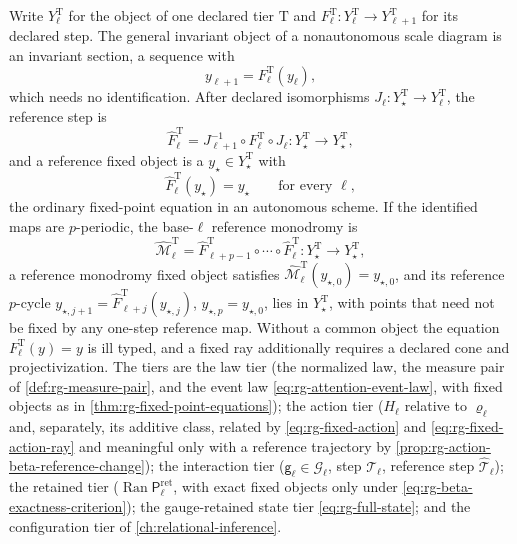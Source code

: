 Write \(Y^{\mathrm T}_\ell\) for the object of one declared tier \(\mathrm T\)
and \(F^{\mathrm T}_\ell:Y^{\mathrm T}_\ell\to Y^{\mathrm T}_{\ell+1}\) for its
declared step. The general invariant object of a nonautonomous scale diagram
is an invariant section, a sequence with
\begin{equation}
y_{\ell+1}=F^{\mathrm T}_\ell(y_\ell),
\label{eq:rg-invariant-section}
\end{equation}
which needs no identification. After declared isomorphisms
\(J_\ell:Y^{\mathrm T}_\star\to Y^{\mathrm T}_\ell\), the reference step is
\begin{equation}
\widehat F^{\mathrm T}_\ell
=J_{\ell+1}^{-1}\circ F^{\mathrm T}_\ell\circ J_\ell
:Y^{\mathrm T}_\star\longrightarrow Y^{\mathrm T}_\star,
\label{eq:rg-reference-step}
\end{equation}
and a reference fixed object is a \(y_\star\in Y^{\mathrm T}_\star\) with
\begin{equation}
\widehat F^{\mathrm T}_\ell(y_\star)=y_\star
\qquad\text{for every }\ell,
\label{eq:rg-reference-fixed-object}
\end{equation}
the ordinary fixed-point equation in an autonomous scheme. If the identified
maps are \(p\)-periodic, the base-\(\ell\) reference monodromy is
\begin{equation}
\widehat{\mathcal M}^{\mathrm T}_\ell
=\widehat F^{\mathrm T}_{\ell+p-1}\circ\cdots\circ\widehat F^{\mathrm T}_\ell
:Y^{\mathrm T}_\star\longrightarrow Y^{\mathrm T}_\star,
\label{eq:rg-monodromy-map}
\end{equation}
a reference monodromy fixed object satisfies
\(\widehat{\mathcal M}^{\mathrm T}_\ell(y_{\star,0})=y_{\star,0}\), and its
reference \(p\)-cycle
\(y_{\star,j+1}=\widehat F^{\mathrm T}_{\ell+j}(y_{\star,j})\),
\(y_{\star,p}=y_{\star,0}\), lies in \(Y^{\mathrm T}_\star\), with points that
need not be fixed by any one-step reference map. Without a common object the
equation \(F^{\mathrm T}_\ell(y)=y\) is ill typed, and a fixed ray additionally
requires a declared cone and projectivization. The tiers are the law tier (the
normalized law, the measure pair of \cref{def:rg-measure-pair}, and the event
law \eqref{eq:rg-attention-event-law}, with fixed objects as in
\cref{thm:rg-fixed-point-equations}); the action tier (\(H_\ell\) relative to
\(\varrho_\ell\) and, separately, its additive class, related by
\eqref{eq:rg-fixed-action} and \eqref{eq:rg-fixed-action-ray} and meaningful
only with a reference trajectory by
\cref{prop:rg-action-beta-reference-change}); the interaction tier
(\(\mathsf g_\ell\in\mathcal G_\ell\), step \(\mathcal T_\ell\), reference step
\(\widehat{\mathcal T}_\ell\)); the retained tier
(\(\operatorname{Ran}\mathsf P^{\mathrm{ret}}_\ell\), with exact fixed objects only
under \eqref{eq:rg-beta-exactness-criterion}); the gauge-retained state tier
\eqref{eq:rg-full-state}; and the configuration tier of
\cref{ch:relational-inference}.

